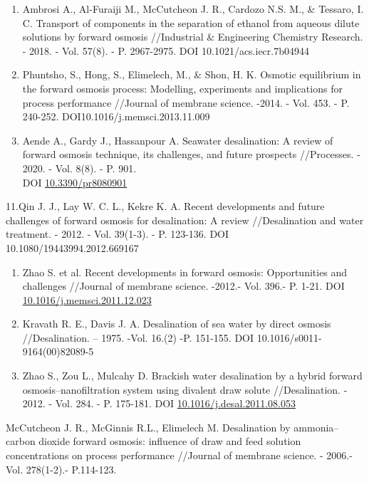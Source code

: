 \begin{enumerate}
\def\labelenumi{\arabic{enumi}.}
\setcounter{enumi}{7}
\item
  Ambrosi A., Al-Furaiji M., McCutcheon J. R., Cardozo N.S. M., \&
  Tessaro, I. C. Transport of components in the separation of ethanol
  from aqueous dilute solutions by forward osmosis //Industrial \&
  Engineering Chemistry Research. - 2018. - Vol. 57(8). - P. 2967-2975.
  DOI 10.1021/acs.iecr.7b04944
\item
  Phuntsho, S., Hong, S., Elimelech, M., \& Shon, H. K. Osmotic
  equilibrium in the forward osmosis process: Modelling, experiments and
  implications for process performance //Journal of membrane science.
  -2014. - Vol. 453. - P. 240-252. DOI10.1016/j.memsci.2013.11.009
\item
  Aende A., Gardy J., Hassanpour A. Seawater desalination: A review of
  forward osmosis technique, its challenges, and future prospects
  //Processes. - 2020. - Vol. 8(8). - P. 901.\\
  DOI \href{http://dx.doi.org/10.3390/pr8080901}{10.3390/pr8080901}
\end{enumerate}

11.Qin J. J., Lay W. C. L., Kekre K. A. Recent developments and future
challenges of forward osmosis for desalination: A review //Desalination
and water treatment. - 2012. - Vol. 39(1-3). - P. 123-136. DOI
10.1080/19443994.2012.669167

\begin{enumerate}
\def\labelenumi{\arabic{enumi}.}
\setcounter{enumi}{10}
\item
  Zhao S. et al. Recent developments in forward osmosis: Opportunities
  and challenges //Journal of membrane science. -2012.- Vol. 396.- P.
  1-21. DOI
  \href{http://dx.doi.org/10.1016/j.memsci.2011.12.023}{10.1016/j.memsci.2011.12.023}
\item
  Kravath R. E., Davis J. A. Desalination of sea water by direct osmosis
  //Desalination. -- 1975. -Vol. 16.(2) -P. 151-155. DOI
  10.1016/s0011-9164(00)82089-5~
\item
  Zhao S., Zou L., Mulcahy D. Brackish water desalination by a hybrid
  forward osmosis--nanofiltration system using divalent draw solute
  //Desalination. - 2012. - Vol. 284. - P. 175-181. DOI
  \href{http://dx.doi.org/10.1016/j.desal.2011.08.053}{10.1016/j.desal.2011.08.053}
\end{enumerate}

McCutcheon J. R., McGinnis R.L., Elimelech M. Desalination by
ammonia--carbon dioxide forward osmosis: influence of draw and feed
solution concentrations on process performance //Journal of membrane
science. - 2006.-Vol. 278(1-2).- P.114-123.

